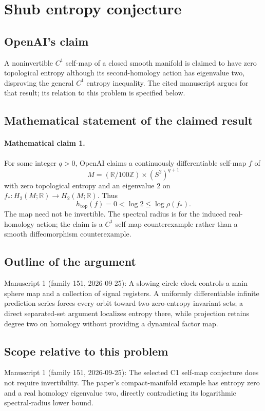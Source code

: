 \documentclass[11pt]{article}
\begin{document}
\section*{Shub entropy conjecture}

\subsection{OpenAI's claim}
A noninvertible $C^1$ self-map of a closed smooth manifold is claimed to have zero topological entropy although its second-homology action has eigenvalue two, disproving the general $C^1$ entropy inequality. The cited manuscript argues for that result; its relation to this problem is specified below.

\subsection{Mathematical statement of the claimed result}
\paragraph{Mathematical claim 1.} For some integer $q>0$, OpenAI claims a continuously differentiable self-map $f$ of
\[
M=(\mathbb R/100\mathbb Z)\times(S^2)^{q+1}
\]
with zero topological entropy and an eigenvalue $2$ on $f_*:H_2(M;\mathbb R)\to H_2(M;\mathbb R)$. Thus
\[
h_{\mathrm{top}}(f)=0<\log2\le\log\rho(f_*).
\]
The map need not be invertible. The spectral radius is for the induced real-homology action; the claim is a $C^1$ self-map counterexample rather than a smooth diffeomorphism counterexample.

\subsection{Outline of the argument}
Manuscript 1 (family 151, 2026-09-25): A slowing circle clock controls a main sphere map and a collection of signal registers. A uniformly differentiable infinite prediction series forces every orbit toward two zero-entropy invariant sets; a direct separated-set argument localizes entropy there, while projection retains degree two on homology without providing a dynamical factor map.

\subsection{Scope relative to this problem}
Manuscript 1 (family 151, 2026-09-25): The selected C1 self-map conjecture does not require invertibility. The paper’s compact-manifold example has entropy zero and a real homology eigenvalue two, directly contradicting its logarithmic spectral-radius lower bound.
\end{document}
